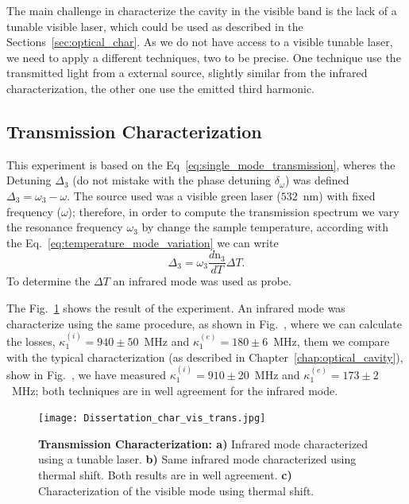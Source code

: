 The main challenge in characterize the cavity in the visible band is the lack of a tunable visible laser, which could be used as described in the Sections~\ref{sec:optical_char}. As we do not have access to a visible tunable laser, we need to apply a different techniques, two to be precise. One technique use the transmitted light from a external source, slightly similar from the infrared characterization, the other one use the emitted third harmonic. 

\subsection{Transmission Characterization}

This experiment is based on the Eq~\ref{eq:single_mode_transmission}, wheres the Detuning $\Delta_3$ (do not mistake with the phase detuning $\delta_\omega$) was defined $\Delta_3 = \omega_3 - \omega$. The source used was a visible green laser ($532$~nm) with fixed frequency ($\omega$); therefore, in order to compute the transmission spectrum we vary the resonance frequency $\omega_3$ by change the sample temperature, according with the Eq.~\ref{eq:temperature_mode_variation} we can write 
\begin{equation}
    \Delta_3 = \omega_3\frac{d\text{n}_3}{dT}\Delta T.
\end{equation}
To determine the $\Delta T$ an infrared mode was used as probe.

The Fig.~\ref{fig:mode_char_trans} shows the result of the experiment. An infrared mode was characterize using the same procedure, as shown in Fig.~, where we can calculate the losses, $\kappa_1^{(i)} = 940\pm 50$~MHz and $\kappa_1^{(e)} = 180 \pm 6$~MHz, them we compare with the typical characterization (as described in Chapter~\ref{chap:optical_cavity}), show in Fig.~, we have measured $\kappa_1^{(i)} = 910\pm 20$~MHz and $\kappa_1^{(e)} = 173 \pm 2$~MHz; both techniques are in well agreement for the infrared mode.
\begin{figure}[!h]
    \centering
    \texttt{[image: Dissertation\_char\_vis\_trans.jpg]}
    \caption{\textbf{Transmission Characterization: a)} Infrared mode characterized using a tunable laser. \textbf{b)} Same infrared mode characterized using thermal shift. Both results are in well agreement. \textbf{c)} Characterization of the visible mode using thermal shift. }
    \label{fig:mode_char_trans}
\end{figure}

